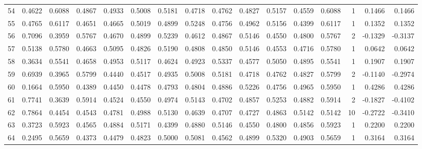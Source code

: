 \begin{tabular}{lrrrrrrrrrrrrrrr}
54  &      0.4622 &  0.6088 &  0.4867 &  0.4933 &  0.5008 &  0.5181 &  0.4718 &  0.4762 &  0.4827 &  0.5157 &   0.4559 &     0.6088 &      1 &                    0.1466 &                     0.1466 \\
55  &      0.4765 &  0.6117 &  0.4651 &  0.4665 &  0.5019 &  0.4899 &  0.5248 &  0.4756 &  0.4962 &  0.5156 &   0.4399 &     0.6117 &      1 &                    0.1352 &                     0.1352 \\
56  &      0.7096 &  0.3959 &  0.5767 &  0.4670 &  0.4899 &  0.5239 &  0.4612 &  0.4867 &  0.5146 &  0.4550 &   0.4800 &     0.5767 &      2 &                   -0.1329 &                    -0.3137 \\
57  &      0.5138 &  0.5780 &  0.4663 &  0.5095 &  0.4826 &  0.5190 &  0.4808 &  0.4850 &  0.5146 &  0.4553 &   0.4716 &     0.5780 &      1 &                    0.0642 &                     0.0642 \\
58  &      0.3634 &  0.5541 &  0.4658 &  0.4953 &  0.5117 &  0.4624 &  0.4923 &  0.5337 &  0.4577 &  0.5050 &   0.4895 &     0.5541 &      1 &                    0.1907 &                     0.1907 \\
59  &      0.6939 &  0.3965 &  0.5799 &  0.4440 &  0.4517 &  0.4935 &  0.5008 &  0.5181 &  0.4718 &  0.4762 &   0.4827 &     0.5799 &      2 &                   -0.1140 &                    -0.2974 \\
60  &      0.1664 &  0.5950 &  0.4389 &  0.4450 &  0.4478 &  0.4793 &  0.4804 &  0.4886 &  0.5226 &  0.4756 &   0.4965 &     0.5950 &      1 &                    0.4286 &                     0.4286 \\
61  &      0.7741 &  0.3639 &  0.5914 &  0.4524 &  0.4550 &  0.4974 &  0.5143 &  0.4702 &  0.4857 &  0.5253 &   0.4882 &     0.5914 &      2 &                   -0.1827 &                    -0.4102 \\
62  &      0.7864 &  0.4454 &  0.4543 &  0.4781 &  0.4988 &  0.5130 &  0.4639 &  0.4707 &  0.4727 &  0.4863 &   0.5142 &     0.5142 &     10 &                   -0.2722 &                    -0.3410 \\
63  &      0.3723 &  0.5923 &  0.4565 &  0.4884 &  0.5171 &  0.4399 &  0.4880 &  0.5146 &  0.4550 &  0.4800 &   0.4856 &     0.5923 &      1 &                    0.2200 &                     0.2200 \\
64  &      0.2495 &  0.5659 &  0.4373 &  0.4479 &  0.4823 &  0.5000 &  0.5081 &  0.4562 &  0.4899 &  0.5320 &   0.4903 &     0.5659 &      1 &                    0.3164 &                     0.3164 \\

\end{tabular}
